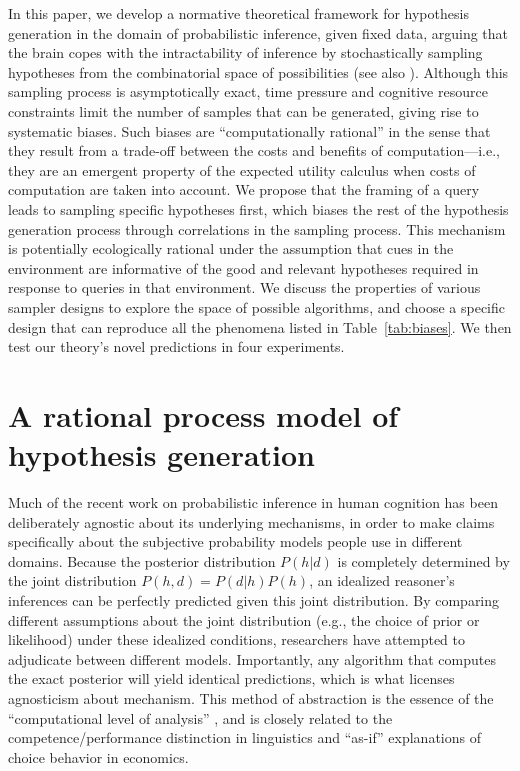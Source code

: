 In this paper, we develop a normative theoretical framework for hypothesis generation in the domain of probabilistic inference, given fixed data, arguing that the brain copes with the intractability of inference by stochastically sampling hypotheses from the combinatorial space of possibilities (see also \citet{sanborn16}). Although this sampling process is asymptotically exact, time pressure and cognitive resource constraints limit the number of samples that can be generated, giving rise to systematic biases. Such biases are ``computationally rational'' in the sense that they result from a trade-off between the costs and benefits of computation---i.e., they are an emergent property of the expected utility calculus when costs of computation are taken into account. \citep{Gershman2015,Vul2014,lieder2017anchoring}
We propose that the framing of a query leads to sampling specific hypotheses first, which biases the rest of the hypothesis generation process through correlations in the sampling process. This mechanism is potentially ecologically rational under the assumption that cues in the environment are informative of the good and relevant hypotheses required in response to queries in that environment. We discuss the properties of various sampler designs to explore the space of possible algorithms, and choose a specific design that can reproduce all the phenomena listed in Table~\ref{tab:biases}. We then test our theory's novel predictions in four experiments.

\section{A rational process model of hypothesis generation}

Much of the recent work on probabilistic inference in human cognition has been deliberately agnostic about its underlying mechanisms, in order to make claims specifically about the subjective probability models people use in different domains. \citep{chater2006} Because the posterior distribution $P(h|d)$ is completely determined by the joint distribution $P(h,d) = P(d|h)P(h)$, an idealized reasoner's inferences can be perfectly predicted given this joint distribution. By comparing different assumptions about the joint distribution (e.g., the choice of prior or likelihood) under these idealized conditions, researchers have attempted to adjudicate between different models. Importantly, any algorithm that computes the exact posterior will yield identical predictions, which is what licenses agnosticism about mechanism. This method of abstraction is the essence of the ``computational level of analysis'' \citep{marr1976understanding}, and is closely related to the competence/performance distinction in linguistics and ``as-if'' explanations of choice behavior in economics.

